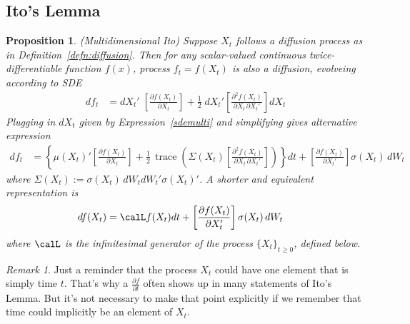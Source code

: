 \documentclass[12pt]{article}
\theoremstyle{plain}
\newtheorem{prop}[thm]{Proposition}
\theoremstyle{definition}
\theoremstyle{remark}
\newtheorem*{rmk}{Remark}
\newcommand{\trace}{\operatorname{trace}}
\begin{document}
\clearpage
\subsection{Ito's Lemma}

\begin{prop}\emph{(Multidimensional Ito)}
Suppose $X_t$ follows a diffusion process as in
Definition~\ref{defn:diffusion}.
Then for any scalar-valued continuous twice-differentiable function
$f(x)$, process $f_t=f(X_t)$ is also a diffusion, evolveing according to
SDE
\begin{align}
  df_t
  &=
  dX_t'
  \;
  \left[
  \frac{\partial f(X_t)}{\partial X_t}
  \right]
  +
  \frac{1}{2}\;
  dX_t'
  \left[
  \frac{\partial^2 f(X_t)}{\partial X_t\, \partial X_t'}
  \right]
  dX_t
  \label{itomulti}
\end{align}
Plugging in $dX_t$ given by Expression~\ref{sdemulti} and simplifying
gives alternative expression
\begin{align}
  df_t
  &=
  \left\{
  \mu(X_t)'
  \left[
  \frac{\partial f(X_t)}{\partial X_t}
  \right]
  +
  \frac{1}{2}\,
  \trace\left(
    \Sigma(X_t)
    \left[
    \frac{\partial^2 f(X_t)}{\partial X_t\,\partial X_t'}
    \right]
  \right)
  \right\}
  dt
  +
  \left[
  \frac{\partial f(X_t)}{\partial X_t'}
  \right]
  \sigma(X_t)
  \,dW_t
  \label{itomultialt}
\end{align}
where $\Sigma(X_t) := \sigma(X_t)\,dW_tdW_t'\sigma(X_t)'$.
A shorter and equivalent representation is
\begin{align*}
  df(X_t)
  &=
  \calL f(X_t)
  dt
  +
  \left[
  \frac{\partial f(X_t)}{\partial X_t'}
  \right]
  \sigma(X_t)
  \,dW_t
  \notag
\end{align*}
where $\calL$ is the infinitesimal generator of the process
$\{X_t\}_{t\geq 0}$, defined below.
\end{prop}
\begin{rmk}
Just a reminder that the process $X_t$ could have one element that is
simply time $t$. That's why a $\frac{\partial f}{\partial t}$ often
shows up in many statements of Ito's Lemma. But it's not necessary to
make that point explicitly if we remember that time could implicitly be
an element of $X_t$.
\end{rmk}
\end{document}
